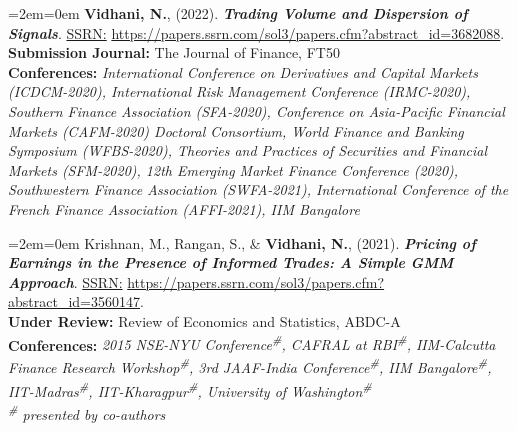 \documentclass[11pt,a4paper,]{moderncv}
\begin{document}
%
  \par%
  \medskip
  \leftskip=2em\rightskip=0em%
  \noindent\ignorespaces
\textbf{Vidhani, N.}, (2022). \textbf{\textit{Trading Volume and Dispersion of Signals}}. \underline{SSRN:} \url{https://papers.ssrn.com/sol3/papers.cfm?abstract_id=3682088}.\\
\textbf{Submission Journal:} The Journal of Finance, FT50\\
\textbf{Conferences:} \textit{International Conference on Derivatives and Capital Markets (ICDCM-2020), International Risk Management Conference (IRMC-2020), Southern Finance Association (SFA-2020), Conference on Asia-Pacific Financial Markets (CAFM-2020) Doctoral Consortium, World Finance and Banking Symposium (WFBS-2020), Theories and Practices of Securities and Financial Markets (SFM-2020), 12th Emerging Market Finance Conference (2020), Southwestern Finance Association (SWFA-2021), International Conference of the French Finance Association (AFFI-2021), IIM Bangalore}\\
%
  \par\medskip

%
  \par%
  \medskip
  \leftskip=2em\rightskip=0em%
  \noindent\ignorespaces
Krishnan, M., Rangan, S., \& \textbf{Vidhani, N.}, (2021). \textbf{\textit{Pricing of Earnings in the Presence of Informed Trades: A Simple GMM Approach}}. \underline{SSRN:} \url{https://papers.ssrn.com/sol3/papers.cfm?abstract_id=3560147}.\\
\textbf{Under Review:} Review of Economics and Statistics, ABDC-A\textsuperscript{\textasteriskcentered}\\
\textbf{Conferences:} \textit{2015 NSE-NYU Conference\textsuperscript{\#}, CAFRAL at RBI\textsuperscript{\#}, IIM-Calcutta Finance Research Workshop\textsuperscript{\#}, 3rd JAAF-India Conference\textsuperscript{\#}, IIM Bangalore\textsuperscript{\#}, IIT-Madras\textsuperscript{\#}, IIT-Kharagpur\textsuperscript{\#}, University of Washington\textsuperscript{\#}}\\
\textit{\textsuperscript{\#} presented by co-authors}\\
%
  \par\medskip

\endgroup
\end{document}

